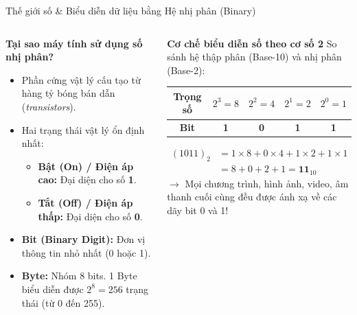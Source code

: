 \documentclass[aspectratio=169, 10pt]{beamer}
\begin{document}
\begin{frame}{Thế giới số \& Biểu diễn dữ liệu bằng Hệ nhị phân (Binary)}
  \begin{columns}
    \begin{block}{\textbf{Tại sao máy tính sử dụng số nhị phân?}}
      \begin{itemize}
        \item Phần cứng vật lý cấu tạo từ hàng tỷ bóng bán dẫn (\textit{transistors}).
        \item Hai trạng thái vật lý ổn định nhất:
          \begin{itemize}
            \item \textbf{Bật (On) / Điện áp cao:} Đại diện cho số \textbf{1}.
            \item \textbf{Tắt (Off) / Điện áp thấp:} Đại diện cho số \textbf{0}.
          \end{itemize}
        \item \textbf{Bit (Binary Digit):} Đơn vị thông tin nhỏ nhất (0 hoặc 1).
        \item \textbf{Byte:} Nhóm 8 bits. 1 Byte biểu diễn được $2^8 = 256$ trạng thái (từ 0 đến 255).
      \end{itemize}
    \end{block}

    \begin{exampleblock}{\textbf{Cơ chế biểu diễn số theo cơ số 2}}
      So sánh hệ thập phân (Base-10) và nhị phân (Base-2):
      \vspace{2mm}
      \centering
      \begin{tabular}{ccccc}
        \toprule
        \textbf{Trọng số} & $2^3 = 8$ & $2^2 = 4$ & $2^1 = 2$ & $2^0 = 1$ \\
        \midrule
        \textbf{Bit} & \textbf{1} & \textbf{0} & \textbf{1} & \textbf{1} \\
        \bottomrule
      \end{tabular}
      \vspace{2mm}
      \begin{align*}
        (1011)_2 &= 1 \times 8 + 0 \times 4 + 1 \times 2 + 1 \times 1 \\
                 &= 8 + 0 + 2 + 1 = \mathbf{11}_{10}
      \end{align*}
      \footnotesize
      $\to$ Mọi chương trình, hình ảnh, video, âm thanh cuối cùng đều được ánh xạ về các dãy bit 0 và 1!
    \end{exampleblock}
  \end{columns}
\end{frame}
\end{document}

